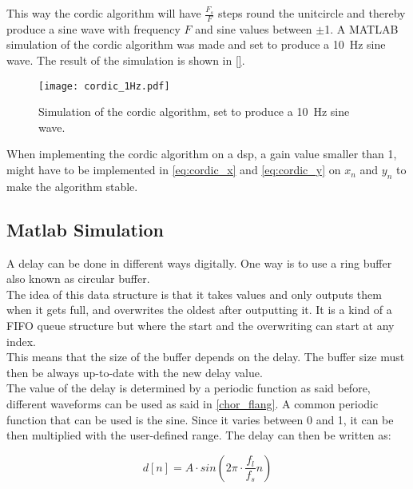 This way the \gls{cordic} algorithm will have $\frac{F_s}{F}$ steps round the unitcircle and thereby produce a sine wave with frequency $F$ and sine values between $\pm$1.
A MATLAB simulation of the \gls{cordic} algorithm was made and set to produce a \SI{10}{\hertz} sine wave. The result of the simulation is shown in \autoref{}.

\begin{figure}[!h]
    \centering
        \texttt{[image: cordic\_1Hz.pdf]}
        \caption{Simulation of the \gls{cordic} algorithm, set to produce a \SI{10}{\hertz} sine wave.}
        \label{fig:cordic_10Hz}
  \end{figure}
  
When implementing the \gls{cordic} algorithm on a \gls{dsp}, a gain value smaller than 1, might have to be implemented in \autoref{eq:cordic_x} and \autoref{eq:cordic_y} on $x_n$ and $y_n$ to make the algorithm stable. 







\subsection{Matlab Simulation}

A delay can be done in different ways digitally. One way is to use a ring buffer also known as circular buffer. \\
The idea of this data structure is that it takes values and only outputs them when it gets full, and overwrites the oldest after outputting it. It is a kind of a FIFO queue structure but where the start and the overwriting can start at any index. \\
This means that the size of the buffer depends on the delay.  The buffer size must then be always up-to-date with the new delay value. \\ 
The value of the delay is determined by a periodic function as said before, different waveforms can be used as said in \autoref{chor_flang}. A common periodic function that can be used is the sine. Since it varies between 0 and 1, it can be then multiplied with the user-defined range. 
The delay can then be written as:

\begin{equation}
	d[n]= A \cdot sin(2\pi  \cdot \frac{f_{l}}{f_{s}} n)
\end{equation}

\startexplain
    \stopexplain 

